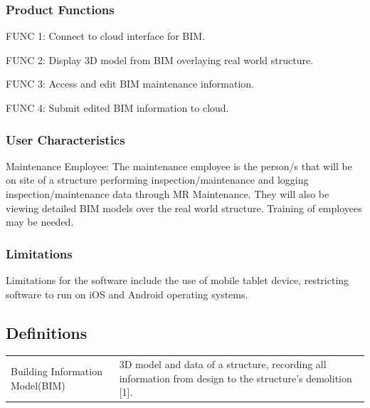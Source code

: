 \documentclass[onecolumn, draftclsnofoot,10pt, compsoc]{IEEEtran}
\begin{document}
            \subsubsection{Product Functions}
                   \hspace{10mm}FUNC 1: \hspace{10mm}Connect to cloud interface for BIM.\par
                   \hspace{10mm}FUNC 2: \hspace{10mm}Display 3D model from BIM overlaying real world structure.\par
                   \hspace{10mm}FUNC 3: \hspace{10mm}Access and edit BIM maintenance information.\par
                   \hspace{10mm}FUNC 4: \hspace{10mm}Submit edited BIM information to cloud.\par

            \subsubsection{User Characteristics}
               \hangindent=10mm\noindent Maintenance Employee: The maintenance employee is the person/s that will be on site of a structure performing inspection/maintenance and logging inspection/maintenance data through MR Maintenance. They will also be viewing detailed BIM models over the real world structure. Training of employees may be needed.\par


            \subsubsection{Limitations}
            \hangindent=10mm\noindent Limitations for the software include the use of mobile tablet device, restricting software to run on iOS and Android operating systems.\par
    \subsection{Definitions}
            \begin{table}[ht]
                \hspace{10mm}
                \begin{tabular}{l p{100mm}}
                   Building Information Model(BIM) & 3D model and data of a structure, recording all information from design to the structure's demolition [1].
                \end{tabular}
            \end{table}
\end{document}
